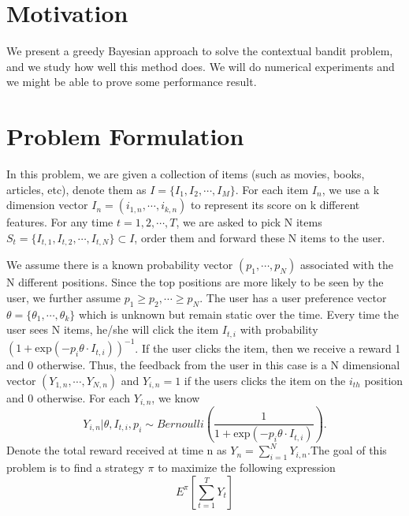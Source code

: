 \documentclass{article}
\begin{document}
 


\section{Motivation}
We present a greedy Bayesian approach to solve the contextual bandit problem, and we study how well this method does. We will do numerical experiments and we might be able to prove some performance result.


\section{Problem Formulation}
In this problem, we are given a collection of items (such as movies, books, articles, etc), denote them as $I=\{I_{1},I_{2},\cdots,I_{M}\}$. For each item $I_{n}$, we use a k dimension vector $I_{n}=(i_{1,n},\cdots,i_{k,n})$ to represent its score on k different features. For any time $t=1,2,\cdots,T$, we are asked to pick N items $S_{t}=\{I_{t,1},I_{t,2},\cdots,I_{t,N}\}\subset I$, order them and forward these N items to the user. 

We assume there is a known probability vector $(p_{1},\cdots,p_{N})$ associated with the N different positions. Since the top positions are more likely to be seen by the user, we further assume $p_{1}\geq p_{2},\cdots\geq p_{N}$. The user has a user preference vector $\theta=\{\theta_{1},\cdots,\theta_{k}\}$ which is unknown but remain static over the time. Every time the user sees N items, he/she will click the item $I_{t,i}$ with probability $\left(1+\mbox{exp}\left(-p_{i}\theta\cdot I_{t,i}\right)\right)^{-1}$. If the user clicks the item, then we receive a reward 1 and 0 otherwise. Thus, the feedback from the user in this case is a N dimensional vector $(Y_{1,n},\cdots,Y_{N,n})$ and $Y_{i,n}=1$ if the users clicks the item on the $i_{th}$ position and 0 otherwise.  For each $Y_{i,n}$, we know 
\begin{equation}
Y_{i,n}|\theta,I_{t,i},p_{i}\sim Bernoulli(\frac{1}{1+\mbox{exp}\left(-p_{i}\theta\cdot I_{t,i}\right)}). \nonumber 
\end{equation}
Denote the total reward received at time n as $Y_{n}=\sum_{i=1}^{N}Y_{i,n}$.The goal of this problem is to find a strategy $\pi$ to maximize the following expression
\begin{equation}
E^{\pi}\left[\sum_{t=1}^{T} Y_{t}\right]
\end{equation}
\end{document}
